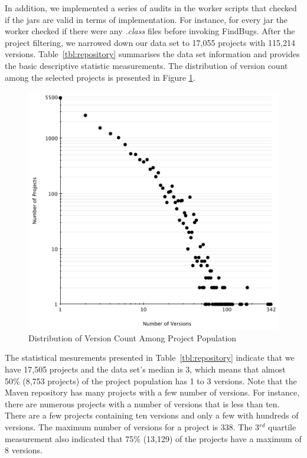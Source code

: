 \documentclass[conference]{llncs}
\begin{document}
In addition, we implemented a series of audits in the worker scripts that
checked if the {\sc jar}s are valid in terms of implementation. For instance,
for every {\sc jar} the worker checked if there were any {\it .class} files
before invoking FindBugs. After the project filtering, we narrowed down
our data set to 17,055 projects with 115,214 versions.
Table~\ref{tbl:repository} summarises the data set information and
provides the basic descriptive statistic measurements. The distribution of version
count among the selected projects is presented in Figure \ref{fig:version-count}.

\begin{figure}
	\centering
	\includegraphics[scale=0.6]{version_count.pdf}
	\caption{Distribution of
Version Count Among Project Population}
	\label{fig:version-count}
\end{figure}

The statistical mesurements presented in Table~\ref{tbl:repository}
indicate that we have 17,505 projects and the data set's median
is 3, which means that almost 50\% (8,753 projects) of the project
population has 1 to 3 versions.
Note that the Maven repository has many projects with a
few number of versions. For instance, there are numerous projects with a
number of versions that is less than ten.
There are a few projects containing ten
versions and only a few with hundreds of versions. The maximum number of
versions for a project is 338. The 3$^{rd}$ quartile measurement
also indicated that 75\% (13,129) of the projects have a maximum of 8 versions.
\end{document}
